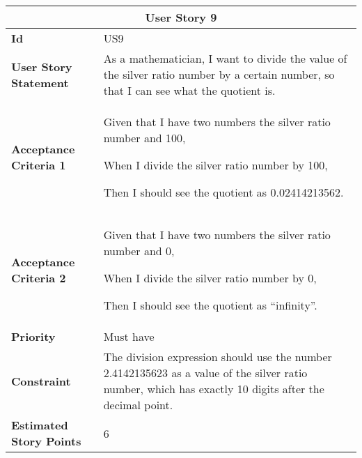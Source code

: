 \hspace{1cm}
\begin{center}
\begin{tabular}{ | m{2cm} | m{12cm} | } 

 \hline
 \multicolumn{2}{|c|}{\textbf{User Story 9}} \\

\hline
\textbf{Id} & US9 \\ 

\hline
\textbf{User Story Statement} & As a mathematician, I want to divide the value of the silver ratio number by a certain number, so that I can see what the quotient is.\\ 

\hline
\textbf{Acceptance Criteria 1} & Given that I have two numbers the silver ratio number and 100,

When I divide the silver ratio number by 100,

Then I should see the quotient as 0.02414213562.\\ 

\hline
\textbf{Acceptance Criteria 2} & Given that I have two numbers the silver ratio number and 0,

When I divide the silver ratio number by 0,

Then I should see the quotient as “infinity”.\\ 

\hline
\textbf{Priority} & Must have \\ 

\hline
\textbf{Constraint} & The division expression should use the number 2.4142135623 as a value of the silver ratio number, which has exactly 10 digits after the decimal point.\\ 

\hline
\textbf{Estimated Story Points} & 6 \\ 
\hline

\end{tabular}
\end{center}
